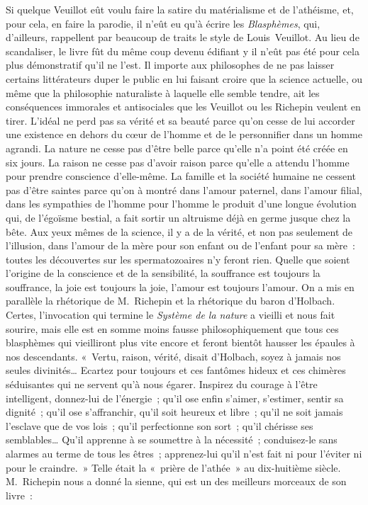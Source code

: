 \documentclass[french,twoside]{book} %
\begin{document}
Si quelque Veuillot eût voulu faire la satire du matérialisme et de l’athéisme, et, pour cela, en faire la parodie, il n’eût eu qu’à écrire les \emph{Blasphèmes}, qui, d’ailleurs, rappellent par beaucoup de traits le style de Louis Veuillot. Au lieu de scandaliser, le livre fût du même coup devenu édifiant y il n’eût pas été pour cela plus démonstratif qu’il ne l’est. Il importe aux philosophes de ne pas laisser certains littérateurs duper le public en lui faisant croire que la science actuelle, ou même que la philosophie naturaliste à laquelle elle semble tendre, ait les conséquences immorales et antisociales que les Veuillot ou les Richepin veulent en tirer. L’idéal ne perd pas sa vérité et sa beauté parce qu’on cesse de lui accorder une existence en dehors du cœur de l’homme et de le personnifier dans un homme agrandi. La nature ne cesse pas d’être belle parce qu’elle n’a point été créée en six jours. La raison ne cesse pas d’avoir raison parce qu’elle a attendu l’homme pour prendre conscience d’elle-même. La famille et la société humaine ne cessent pas d’être saintes parce qu’on à montré dans l’amour paternel, dans l’amour filial, dans les sympathies de l’homme pour l’homme le produit d’une longue évolution qui, de l’égoïsme bestial, a fait sortir un altruisme déjà en germe jusque chez la bête. Aux yeux mêmes de la science, il y a de la vérité, et non pas seulement de l’illusion, dans l’amour de la mère pour son enfant ou de l’enfant pour sa mère : toutes les découvertes sur les spermatozoaires n’y feront rien. Quelle que soient l’origine de la conscience et de la sensibilité, la souffrance est toujours la souffrance, la joie est toujours la joie, l’amour est toujours l’amour. On a mis en parallèle la rhétorique de M. Richepin et la rhétorique du baron d’Holbach. Certes, l’invocation qui termine le \emph{Système de la nature} a vieilli et nous fait sourire, mais elle est en somme moins fausse philosophiquement que tous ces blasphèmes qui vieilliront plus vite encore et feront bientôt hausser les épaules à nos descendants. « Vertu, raison, vérité, disait d’Holbach, soyez à jamais nos seules divinités… Ecartez pour toujours et ces fantômes hideux et ces chimères séduisantes qui ne servent qu’à nous égarer. Inspirez du courage à l’être intelligent, donnez-lui de l’énergie ; qu’il ose enfin s’aimer, s’estimer, sentir sa dignité ; qu’il ose s’affranchir, qu’il soit heureux et libre ; qu’il ne soit jamais l’esclave que de vos lois ; qu’il perfectionne son sort ; qu’il chérisse ses semblables… Qu’il apprenne à se soumettre à la nécessité ; conduisez-le sans alarmes au terme de tous les êtres ; apprenez-lui qu’il n’est fait ni pour l’éviter ni pour le craindre. » Telle était la « prière de l’athée » au dix-huitième siècle. M. Richepin nous a donné la sienne, qui est un des meilleurs morceaux de son livre :\par
\end{document}
